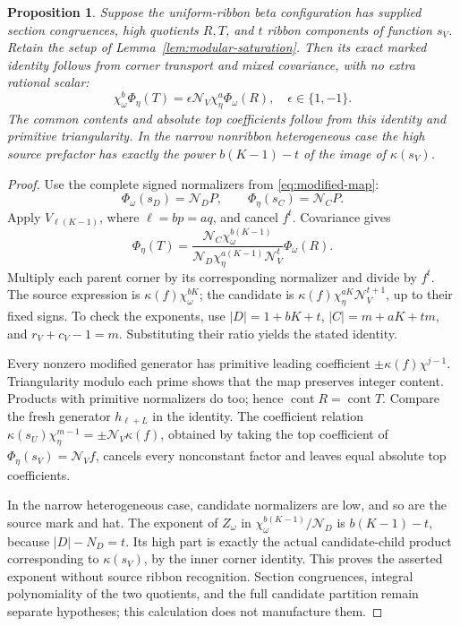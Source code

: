 \documentclass[11pt,a4paper]{amsart}
\numberwithin{equation}{section}
\theoremstyle{plain}
\newtheorem{proposition}[theorem]{Proposition}
\theoremstyle{definition}
\begin{document}
\begin{proposition}\label{prop:exact-high-identity}
Suppose the uniform-ribbon beta configuration has supplied section congruences, high quotients \(R,T\), and \(t\) ribbon components of function \(s_V\).  Retain the setup of Lemma~\ref{lem:modular-saturation}.  Then its exact marked identity follows from corner transport and mixed covariance, with no extra rational scalar:
\[
 \chi_\omega^b\Phi_\eta(T)
 =\epsilon\mathcal N_V\chi_\eta^a\Phi_\omega(R),\quad\epsilon\in\{1,-1\}.
\]
The common contents and absolute top coefficients follow from this identity and primitive triangularity.  In the narrow nonribbon heterogeneous case the high source prefactor has exactly the power \(b(K-1)-t\) of the image of \(\kappa(s_V)\).
\end{proposition}
\begin{proof}
Use the complete signed normalizers from \eqref{eq:modified-map}:
\[
 \Phi_\omega(s_D)=\mathcal N_D P,\qquad
 \Phi_\eta(s_C)=\mathcal N_C P.
\]
Apply \(V_{\ell(K-1)}\), where \(\ell=bp=aq\), and cancel \(f^t\).  Covariance gives
\[
 \Phi_\eta(T)=\frac{\mathcal N_C\chi_\omega^{b(K-1)}}
 {\mathcal N_D\chi_\eta^{a(K-1)}\mathcal N_V^t}\Phi_\omega(R).
\]
Multiply each parent corner by its corresponding normalizer and divide by \(f^t\).  The source expression is \(\kappa(f)\chi_\omega^{bK}\); the candidate is \(\kappa(f)\chi_\eta^{aK}\mathcal N_V^{t+1}\), up to their fixed signs.  To check the exponents, use \(|D|=1+bK+t\), \(|C|=m+aK+tm\), and \(r_V+c_V-1=m\).  Substituting their ratio yields the stated identity.

Every nonzero modified generator has primitive leading coefficient \(\pm\kappa(f)\chi^{j-1}\).  Triangularity modulo each prime shows that the map preserves integer content.  Products with primitive normalizers do too; hence \(\operatorname{cont}R=\operatorname{cont}T\).  Compare the fresh generator \(h_{\ell+L}\) in the identity.  The coefficient relation \(\kappa(s_U)\chi_\eta^{m-1}=\pm\mathcal N_V\kappa(f)\), obtained by taking the top coefficient of \(\Phi_\eta(s_V)=\mathcal N_V f\), cancels every nonconstant factor and leaves equal absolute top coefficients.

In the narrow heterogeneous case, candidate normalizers are low, and so are the source mark and hat.  The exponent of \(Z_\omega\) in \(\chi_\omega^{b(K-1)}/\mathcal N_D\) is \(b(K-1)-t\), because \(|D|-N_D=t\).  Its high part is exactly the actual candidate-child product corresponding to \(\kappa(s_V)\), by the inner corner identity.  This proves the asserted exponent without source ribbon recognition.  Section congruences, integral polynomiality of the two quotients, and the full candidate partition remain separate hypotheses; this calculation does not manufacture them.
\end{proof}
\end{document}
